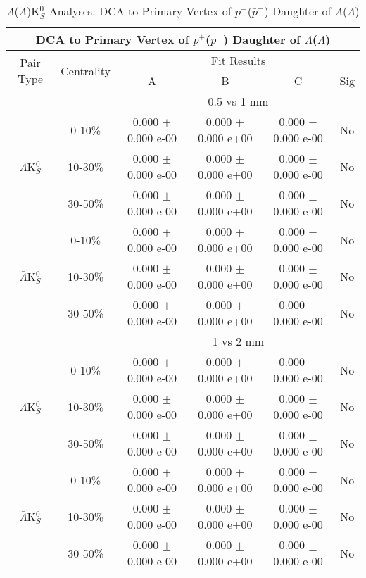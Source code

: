 \documentclass[../AnalysisNoteJBuxton.tex]{subfiles}
\begin{document}
\begin{table}
 \centering
 \begin{tabular}{|c|c|c|c|c|c|}
  \multicolumn{6}{c}{DCA to Primary Vertex of $p^{+}$($\bar{p}^{-}$) Daughter of $\Lambda$($\bar{\Lambda}$)} \\
  \hline
  \multirow{2}{*}{Pair Type} & \multirow{2}{*}{Centrality} & \multicolumn{4}{c|}{Fit Results} \\
  \cline{3-6}
   & & A & B & C & Sig \\  
  \hline
  \multicolumn{2}{|c}{} & \multicolumn{4}{c|}{0.5 vs 1 mm} \\  
  \hline  
  \multirow{3}{*}{$\Lambda$K$^{0}_{S}$}
   &  0-10\% & 0.000 $\pm$ 0.000 e-00 & 0.000 $\pm$ 0.000 e+00 & 0.000 $\pm$ 0.000 e-00 & No \\
   & 10-30\% & 0.000 $\pm$ 0.000 e-00 & 0.000 $\pm$ 0.000 e+00 & 0.000 $\pm$ 0.000 e-00 & No \\
   & 30-50\% & 0.000 $\pm$ 0.000 e-00 & 0.000 $\pm$ 0.000 e+00 & 0.000 $\pm$ 0.000 e-00 & No \\
  \hline
  \multirow{3}{*}{$\bar{\Lambda}$K$^{0}_{S}$}  
   &  0-10\% & 0.000 $\pm$ 0.000 e-00 & 0.000 $\pm$ 0.000 e+00 & 0.000 $\pm$ 0.000 e-00 & No \\
   & 10-30\% & 0.000 $\pm$ 0.000 e-00 & 0.000 $\pm$ 0.000 e+00 & 0.000 $\pm$ 0.000 e-00 & No \\
   & 30-50\% & 0.000 $\pm$ 0.000 e-00 & 0.000 $\pm$ 0.000 e+00 & 0.000 $\pm$ 0.000 e-00 & No \\
  \hline 
  \multicolumn{2}{|c}{} & \multicolumn{4}{c|}{1 vs 2 mm} \\
  \hline  
  \multirow{3}{*}{$\Lambda$K$^{0}_{S}$}   
   &  0-10\% & 0.000 $\pm$ 0.000 e-00 & 0.000 $\pm$ 0.000 e+00 & 0.000 $\pm$ 0.000 e-00 & No \\
   & 10-30\% & 0.000 $\pm$ 0.000 e-00 & 0.000 $\pm$ 0.000 e+00 & 0.000 $\pm$ 0.000 e-00 & No \\
   & 30-50\% & 0.000 $\pm$ 0.000 e-00 & 0.000 $\pm$ 0.000 e+00 & 0.000 $\pm$ 0.000 e-00 & No \\
  \hline  
  \multirow{3}{*}{$\bar{\Lambda}$K$^{0}_{S}$}
   &  0-10\% & 0.000 $\pm$ 0.000 e-00 & 0.000 $\pm$ 0.000 e+00 & 0.000 $\pm$ 0.000 e-00 & No \\
   & 10-30\% & 0.000 $\pm$ 0.000 e-00 & 0.000 $\pm$ 0.000 e+00 & 0.000 $\pm$ 0.000 e-00 & No \\
   & 30-50\% & 0.000 $\pm$ 0.000 e-00 & 0.000 $\pm$ 0.000 e+00 & 0.000 $\pm$ 0.000 e-00 & No \\
  \hline
 \end{tabular}
 \caption{$\Lambda$($\bar{\Lambda}$)K$^{0}_{S}$ Analyses: DCA to Primary Vertex of $p^{+}$($\bar{p}^{-}$) Daughter of $\Lambda$($\bar{\Lambda}$)}
 \label{tab:DcaToPrimVertexProtonDaughtOfLamLamK0Full}
\end{table}
\end{document}
